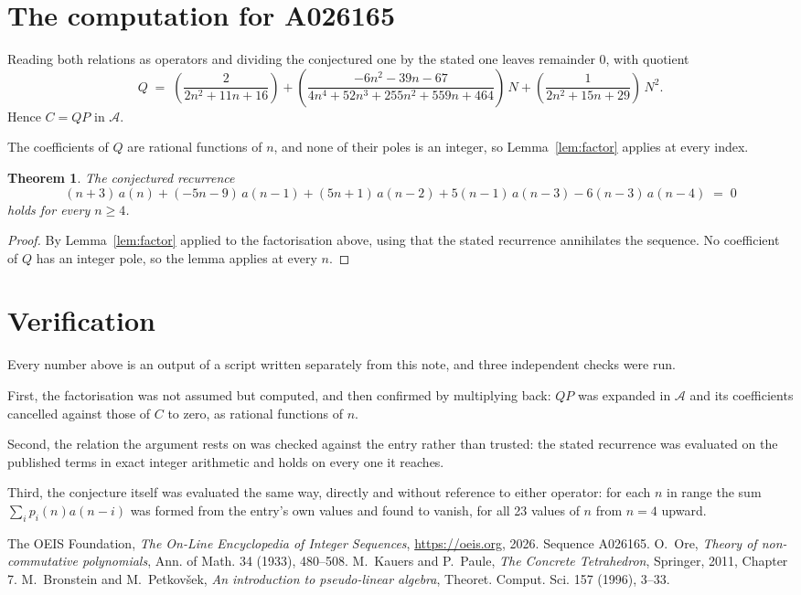 \documentclass[11pt,a4paper]{article}
\theoremstyle{plain}
\newtheorem{theorem}{Theorem}
\theoremstyle{definition}
\begin{document}
\section{The computation for A026165}

Reading both relations as operators and dividing the conjectured one by the stated one
leaves remainder $0$, with quotient
\[
Q \;=\; \left(\frac{2}{2 n^{2} + 11 n + 16}\right) + \left(\frac{- 6 n^{2} - 39 n - 67}{4 n^{4} + 52 n^{3} + 255 n^{2} + 559 n + 464}\right)\,N + \left(\frac{1}{2 n^{2} + 15 n + 29}\right)\,N^{2} .
\]
Hence $C=QP$ in $\mathcal{A}$.

The coefficients of $Q$ are rational functions of $n$, and none of their poles is an integer, so Lemma~\ref{lem:factor} applies at every index.

\begin{theorem}
The conjectured recurrence
\[
(n + 3)\,a(n) + (- 5 n - 9)\,a(n-1) + (5 n + 1)\,a(n-2) + 5 \left(n - 1\right)\,a(n-3) -  6 \left(n - 3\right)\,a(n-4) \;=\;0
\]
holds for every $n\ge4$.
\end{theorem}

\begin{proof}
By Lemma~\ref{lem:factor} applied to the factorisation above, using that the stated
recurrence annihilates the sequence. No coefficient of $Q$ has an integer pole, so the lemma applies at every $n$.
\end{proof}

\section{Verification}

Every number above is an output of a script written separately from this note, and three
independent checks were run.

First, the factorisation was not assumed but computed, and then confirmed by multiplying
back: $QP$ was expanded in $\mathcal{A}$ and its coefficients cancelled against those of
$C$ to zero, as rational functions of $n$.

Second, the relation the argument rests on was checked against the entry rather than
trusted: the stated recurrence was evaluated on the published terms in exact integer
arithmetic and holds on every one it reaches.

Third, the conjecture itself was evaluated the same way, directly and without reference to
either operator: for each $n$ in range the sum $\sum_{i}p_{i}(n)a(n-i)$ was formed from the
entry's own values and found to vanish, for all 23 values of $n$ from
$n=4$ upward.

\begin{thebibliography}{9}
 The OEIS Foundation, \emph{The On-Line Encyclopedia of Integer Sequences},
\url{https://oeis.org}, 2026. Sequence A026165.
 O.~Ore, \emph{Theory of non-commutative polynomials}, Ann. of Math. 34
(1933), 480--508.
 M.~Kauers and P.~Paule, \emph{The Concrete Tetrahedron}, Springer, 2011,
Chapter 7.
 M.~Bronstein and M.~Petkov\v{s}ek, \emph{An introduction to
pseudo-linear algebra}, Theoret. Comput. Sci. 157 (1996), 3--33.
\end{thebibliography}
\end{document}
